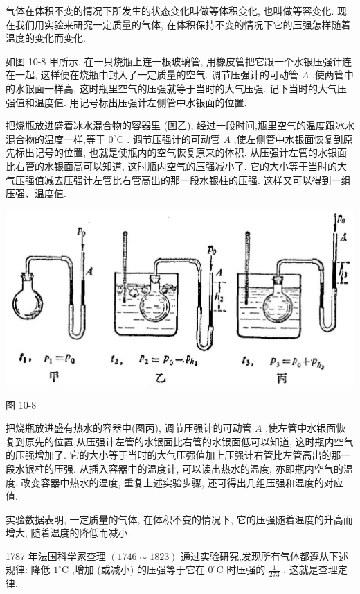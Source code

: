 \documentclass[10pt]{article}
\begin{document}
气体在体积不变的情况下所发生的状态变化叫做等体积变化, 也叫做等容变化. 现在我们用实验来研究一定质量的气体, 在体积保持不变的情况下它的压强怎样随着温度的变化而变化.

如图 10-8 甲所示, 在一只烧瓶上连一根玻璃管, 用橡皮管把它跟一个水银压强计连在一起, 这样便在烧瓶中封入了一定质量的空气. 调节压强计的可动管 \(A\) ,使两管中的水银面一样高, 这时瓶里空气的压强就等于当时的大气压强. 记下当时的大气压强值和温度值. 用记号标出压强计左侧管中水银面的位置.

把烧瓶放进盛着冰水混合物的容器里 (图乙), 经过一段时间,瓶里空气的温度跟冰水混合物的温度一样,等于 \({0}^{ \circ }\mathrm{C}\) . 调节压强计的可动管 \(A\) ,使左侧管中水银面恢复到原先标出记号的位置, 也就是使瓶内的空气恢复原来的体积. 从压强计左管的水银面比右管的水银面高可以知道, 这时瓶内空气的压强减小了. 它的大小等于当时的大气压强值减去压强计左管比右管高出的那一段水银柱的压强. 这样又可以得到一组压强、温度值.

\begin{center}
\includegraphics[max width=1.0\textwidth]{images/01912d55-147c-70aa-b0e0-1782a122f948_289_235469.jpg}
\end{center}

图 10-8

把烧瓶放进盛有热水的容器中(图丙), 调节压强计的可动管 \(A\) ,使左管中水银面恢复到原先的位置,从压强计左管的水银面比右管的水银面低可以知道, 这时瓶内空气的压强增加了. 它的大小等于当时的大气压强值加上压强计右管比左管高出的那一段水银柱的压强. 从插入容器中的温度计, 可以读出热水的温度, 亦即瓶内空气的温度. 改变容器中热水的温度, 重复上述实验步骤, 还可得出几组压强和温度的对应值.

实验数据表明, 一定质量的气体, 在体积不变的情况下, 它的压强随着温度的升高而增大, 随着温度的降低而减小.

1787 年法国科学家查理 \(\left( {{1746} \sim {1823}}\right)\) 通过实验研究,发现所有气体都遵从下述规律: 降低 \({1}^{ \circ }\mathrm{C}\) ,增加 (或减小) 的压强等于它在 \({0}^{ \circ }\mathrm{C}\) 时压强的 \(\frac{1}{273}\) . 这就是查理定律.
\end{document}

